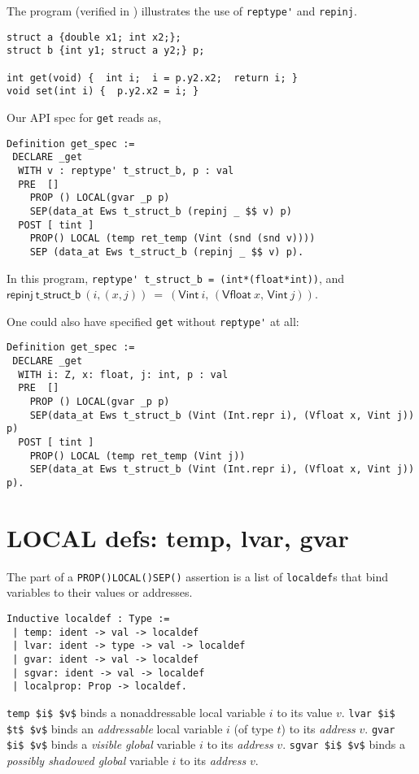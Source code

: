 \documentclass[12pt,fleqn,openany,oneside,showtrims]{memoir}
\begin{document}
The program  (verified in
)  illustrates the use of \lstinline{reptype'}
and \lstinline{repinj}.
\begin{lstlisting}
struct a {double x1; int x2;};
struct b {int y1; struct a y2;} p;

int get(void) {  int i;  i = p.y2.x2;  return i; }
void set(int i) {  p.y2.x2 = i; }
\end{lstlisting}
Our API spec for \lstinline{get} reads as,
\begin{lstlisting}
Definition get_spec :=
 DECLARE _get
  WITH v : reptype' t_struct_b, p : val
  PRE  []
    PROP () LOCAL(gvar _p p)
    SEP(data_at Ews t_struct_b (repinj _ $$ v) p)
  POST [ tint ]
    PROP() LOCAL (temp ret_temp (Vint (snd (snd v))))
    SEP (data_at Ews t_struct_b (repinj _ $$ v) p).
\end{lstlisting}
In this program, \lstinline{reptype' t_struct_b = (int*(float*int))},
and \newline
$\mathsf{repinj}~\mathsf{t\_struct\_b}~(i,(x,j))~=~(\mathsf{Vint}~i,\,(\mathsf{Vfloat}~x,\,\mathsf{Vint}~j))$.

One could also have specified \lstinline{get} without \lstinline{reptype'} at all:
\begin{lstlisting}
Definition get_spec :=
 DECLARE _get
  WITH i: Z, x: float, j: int, p : val
  PRE  []
    PROP () LOCAL(gvar _p p)
    SEP(data_at Ews t_struct_b (Vint (Int.repr i), (Vfloat x, Vint j)) p)
  POST [ tint ]
    PROP() LOCAL (temp ret_temp (Vint j))
    SEP(data_at Ews t_struct_b (Vint (Int.repr i), (Vfloat x, Vint j)) p).
\end{lstlisting}

\chapter{{\upshape LOCAL} defs: \upshape \sffamily temp, lvar, gvar}
\label{refcard:localdefs}
\label{refcard:gvar}

The \LOCAL{} part of a \lstinline{PROP()LOCAL()SEP()} assertion
is a list of \lstinline{localdef}s that
bind variables to their values or addresses.

\begin{lstlisting}
Inductive localdef : Type :=
 | temp: ident -> val -> localdef
 | lvar: ident -> type -> val -> localdef
 | gvar: ident -> val -> localdef
 | sgvar: ident -> val -> localdef
 | localprop: Prop -> localdef.
\end{lstlisting}
\lstinline{temp $i$ $v$} binds a nonaddressable local
variable $i$ to its value $v$.\newline
\lstinline{lvar $i$ $t$ $v$} binds an \emph{addressable} local
variable $i$ (of type $t$) to its \emph{address} $v$.\newline
\lstinline{gvar $i$ $v$} binds a \emph{visible global}
variable $i$ to its \emph{address} $v$.\newline
\lstinline{sgvar $i$ $v$} binds a \emph{possibly shadowed global}
variable $i$ to its \emph{address} $v$.
\end{document}
